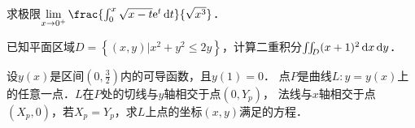 \documentclass[plain,noanswer,medmath]{../../template/jnuexam}
\begin{document}


\begin{problem}[points=10]
求极限$\lim_{x \to 0^+} \frac{\int_0^x \sqrt{x - t} \e^t \dt}{\sqrt{x^3}}$．
\end{problem}










\begin{problem}[points=11]
已知平面区域$D = \left\{(x,y)|x^2 + y^2 \le 2y \right\}$，计算二重积分$\iint_D (x + 1)^2 \mathop{}\!\mathrm{d} x\mathop{}\!\mathrm{d} y$．
\end{problem}


\begin{problem}[points=11]
设$y(x)$是区间$\left(0,\frac{3}{2} \right)$内的可导函数，且$y(1) = 0$．
点$P$是曲线$L:y = y(x)$上的任意一点．$L$在$P$处的切线与$y$轴相交于点$\left(0,Y_p\right)$，
法线与$x$轴相交于点$\left(X_p,0 \right)$，若$X_p = Y_p$，求$L$上点的坐标$(x,y)$满足的方程．
\end{problem}




\end{document}
